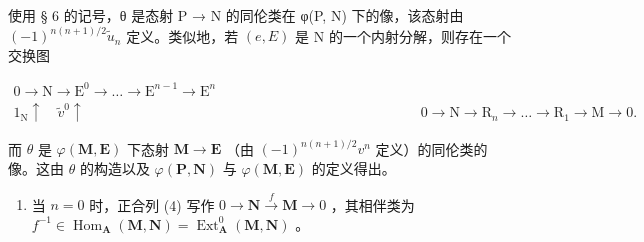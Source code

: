 使用 § 6 的记号，θ 是态射 P → N 的同伦类在 φ(P, N) 下的像，该态射由 \((-1)^{n(n+1)/2} \tilde{u}_{n}\) 定义。类似地，若 \((e, E)\) 是 N 的一个内射分解，则存在一个交换图

\[
\begin{array}{c} 0 \longrightarrow \mathrm{N} \longrightarrow \mathrm{E} ^ {0} \longrightarrow \dots \longrightarrow \mathrm{E} ^ {n - 1} \longrightarrow \mathrm{E} ^ {n} \\ 1 _ {\mathrm{N}} \uparrow \quad \tilde {v} ^ {0} \uparrow \quad \quad \quad \quad \quad \quad \quad \quad \quad \quad \quad \quad \quad \quad \quad \quad \quad \quad \quad \quad \quad \quad \quad \quad 0 \longrightarrow \mathrm{N} \longrightarrow \mathrm{R} _ {n} \longrightarrow \dots \longrightarrow \mathrm{R} _ {1} \longrightarrow \mathrm{M} \longrightarrow 0. \end{array}
\]

而 \(\theta\) 是 \(\varphi(\mathbf{M},\mathbf{E})\) 下态射 \(\mathbf{M}\to\mathbf{E}\) （由 \((-1)^{n(n+1)/2}v^{n}\) 定义）的同伦类的像。这由 \(\theta\) 的构造以及 \(\varphi(\mathbf{P},\mathbf{N})\) 与 \(\varphi(\mathbf{M},\mathbf{E})\) 的定义得出。

\begin{enumerate}
\def\labelenumi{\arabic{enumi})}
\setcounter{enumi}{1}
\tightlist
\item
  当 \(n = 0\) 时，正合列 (4) 写作 \(0 \to \mathbf{N} \xrightarrow{f} \mathbf{M} \to 0\) ，其相伴类为 \(f^{-1} \in \operatorname{Hom}_{\mathbf{A}}(\mathbf{M}, \mathbf{N}) = \operatorname{Ext}_{\mathbf{A}}^{0}(\mathbf{M}, \mathbf{N})\) 。
\end{enumerate}

